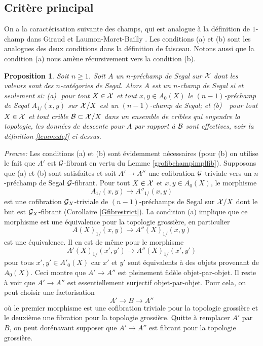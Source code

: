 \documentclass[12pt]{article}
\newcommand{\subnumero}[1]{\subsection*{#1}\phantomsection\addcontentsline{toc}{subsection}{#1}}
\newtheorem{proposition}[lemma]{Proposition}
\newcommand{\Gg}{{\cal G}}
\newcommand{\Bb}{{\cal B}}
\newcommand{\Xx}{{\cal X}}
\begin{document}
\subnumero{Crit\`ere principal}

On a la caract\'erisation suivante des champs, qui est analogue \`a la
d\'efinition de
$1$-champ dans Giraud \cite{GiraudThese} et Laumon-Moret-Bailly
\cite{LaumonMB}.
Les conditions (a) et (b) sont les analogues des deux conditions dans la
d\'efinition de faisceau. Notons aussi que la condition (a) nous am\`ene
r\'ecursivement vers la condition (b).


\begin{proposition}
\label{critere}
Soit $n\geq 1$.
Soit $A$ un $n$-pr\'echamp de Segal sur $\Xx$ dont les valeurs sont
des $n$-cat\'egories de Segal.
Alors $A$ est un $n$-champ de Segal si et seulement si:
\newline
(a)\,\, pour tout $X\in \Xx$ et tout $x,y\in A_0(X)$ le $(n-1)$-pr\'echamp
de Segal $A_{1/}(x,y)$ sur $\Xx /X$ est un $(n-1)$-champ de Segal; et
\newline
(b) \,\, pour tout $X\in \Xx$ et tout crible $\Bb \subset \Xx /X$ dans un
ensemble de cribles qui engendre la topologie, les donn\'ees de descente
pour $A$
par rapport \`a $\Bb$ sont effectives, voir la d\'efinition
\ref{lemmedef}
ci-dessus.
\end{proposition}
{\em Preuve:}
Les conditions (a) et (b) sont \'evidemment n\'ecessaires (pour (b) on
utilise le
fait que $A'$ est $\Gg$-fibrant en vertu du  Lemme \ref{grofibchampimplfib}).
Supposons que (a) et (b) sont satisfaites et soit $A'\rightarrow A''$ une
cofibration $\Gg$-triviale vers un $n$-pr\'echamp de Segal $\Gg$-fibrant. Pour
tout $X\in \Xx$ et $x,y\in A_0(X)$, le morphisme
$$
A_{1/} (x,y)\rightarrow         A''_{1/}(x,y)
$$
est une cofibration $\Gg_X$-triviale de $(n-1)$-pr\'echamps de Segal sur
$\Xx /X$ dont le but est
$\Gg _X$-fibrant (Corollaire \ref{Gfibrestrict}).  La condition (a) 
implique que
ce morphisme est  une \'equivalence pour la
topologie grossi\`ere, en particulier
$$
A(X)_{1/} (x,y)\rightarrow      A''(X)_{1/}(x,y)
$$
est une \'equivalence. Il en est de m\^eme pour le morphisme
$$
A'(X)_{1/} (x',y')\rightarrow  A''(X)_{1/}(x',y')
$$
pour
tous $x',y'\in A'_0(X)$ car $x'$ et $y'$ sont \'equivalents \`a des objets
provenant
de $A_0(X)$. Ceci montre que $A'\rightarrow A''$ est pleinement fid\`ele
objet-par-objet. Il reste \`a voir que $A'\rightarrow A''$ est essentiellement
surjectif objet-par-objet. Pour cela, on peut choisir une factorisation
$$
A'\rightarrow B \rightarrow A''
$$
o\`u le premier morphisme est une cofibration triviale pour la topologie
grossi\`ere et le deuxi\`eme une fibration pour la topologie
grossi\`ere. Quitte \`a remplacer $A'$ par $B$, on peut dor\'enavant
supposer que
$A'\rightarrow A''$ est fibrant pour la topologie grossi\`ere.
\end{document}
